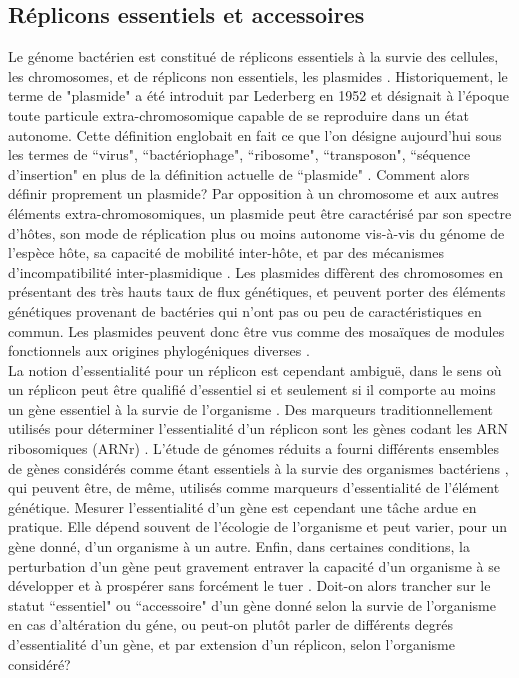  
 \subsection{Réplicons essentiels et accessoires}\label{essacc}
Le génome bactérien est constitué de réplicons essentiels à la survie des cellules, les chromosomes, et de réplicons non essentiels, les plasmides \citep{Mackenzie2004}. Historiquement, le terme de "plasmide" a été introduit par Lederberg en 1952 \citep{lederberg1952cell} et désignait à l'époque toute particule extra-chromosomique capable de se reproduire dans un état autonome. Cette définition englobait en fait ce que l'on désigne aujourd'hui sous les termes de ``virus", ``bactériophage", ``ribosome", ``transposon", ``séquence d'insertion" en plus de la définition actuelle de ``plasmide" \citep{lederberg1952cell}. Comment alors définir proprement un plasmide? Par opposition à un chromosome et aux autres éléments extra-chromosomiques, un plasmide peut être caractérisé par son spectre d'hôtes, son mode de réplication plus ou moins autonome vis-à-vis du génome de l'espèce hôte, sa capacité de mobilité inter-hôte, et par des mécanismes d'incompatibilité inter-plasmidique \citep{Slater2008,helinski2004introduction}. Les plasmides diffèrent des chromosomes en présentant des très hauts taux de flux génétiques, et peuvent porter des éléments génétiques provenant de bactéries qui n'ont pas ou peu de caractéristiques en commun. Les plasmides peuvent donc être vus comme des mosaïques de modules fonctionnels aux origines phylogéniques diverses \citep{Fernandez-Lopez2006}.\\
	La notion d'essentialité pour un réplicon est cependant ambiguë, dans le sens où un réplicon peut être qualifié d'essentiel si et seulement si il comporte au moins un gène essentiel à la survie de l'organisme \citep{Mackenzie2004}. Des marqueurs traditionnellement utilisés pour déterminer l'essentialité d'un réplicon sont les gènes codant les ARN ribosomiques (ARNr) \citep{Mackenzie2004}. L'étude de génomes réduits a fourni différents ensembles de gènes considérés comme étant essentiels à la survie des organismes bactériens \citep{Glass2006,Koonin2000}, qui peuvent être, de même, utilisés comme marqueurs d'essentialité de l'élément génétique. Mesurer l'essentialité d'un gène est cependant une tâche ardue en pratique. Elle dépend souvent de l'écologie de l'organisme et peut varier, pour un gène donné, d'un organisme à un autre. Enfin, dans certaines conditions, la perturbation d'un gène peut gravement entraver la capacité d'un organisme à se développer et à prospérer sans forcément le tuer \citep{Mackenzie2004,Slater2008}. Doit-on alors trancher sur le statut ``essentiel" ou ``accessoire" d'un gène donné selon la survie de l'organisme en cas d'altération du géne, ou peut-on plutôt parler de différents degrés d'essentialité d'un gène, et par extension d'un réplicon, selon l'organisme considéré?
 
